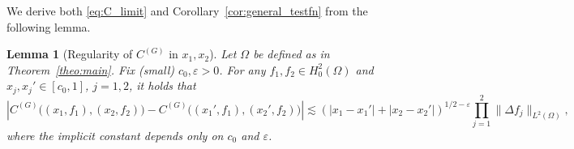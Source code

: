 \documentclass[10pt]{amsart}
\newtheorem{lemma}[theorem]{Lemma}
\numberwithin{equation}{section}
\begin{document}
We derive both \eqref{eq:C_limit} and Corollary~\ref{cor:general_testfn} from the following lemma. 

\begin{lemma}[Regularity of $C^{(G)}$ in $x_1,x_2$]\label{lem:C_reg} Let $\Omega$ be defined as in Theorem~\ref{theo:main}. Fix (small) $c_0,\varepsilon>0$. For any $f_1,f_2\in H_0^{2}(\Omega)$ and $x_j,x_j'\in [c_0,1]$, $j=1,2$, it holds that
\begin{equation}
\left\vert C^{(G)}\big((x_1,f_1),(x_2,f_2)\big) - C^{(G)}\big((x_1',f_1),(x_2',f_2)\big)\right\vert \lesssim \left(|x_1-x_1'|+|x_2-x_2'|\right)^{1/2-\varepsilon} \prod_{j=1}^2\|\Delta f_j\|_{L^2(\Omega)},
\label{eq:C_reg}
\end{equation}
where the implicit constant depends only on $c_0$ and $\varepsilon$.
\end{lemma}
\end{document}
